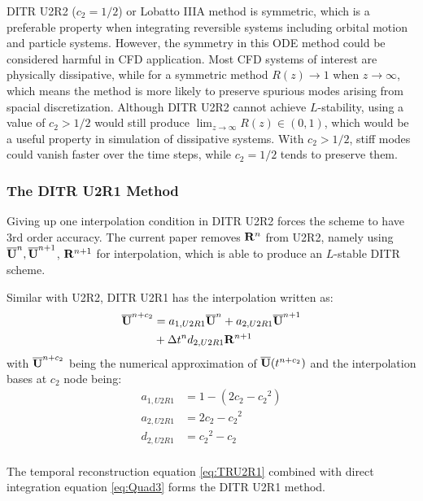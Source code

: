 \documentclass[preprint,12pt]{elsarticle}
\begin{document}
DITR U2R2 ($c_2=1/2$) or Lobatto IIIA method is symmetric,
which is a preferable property when integrating
reversible systems including orbital motion and particle 
systems. 
However,
the symmetry in this ODE method could be considered harmful in CFD application.
Most CFD systems of interest are physically dissipative,
while for a symmetric method
$R(z) \rightarrow 1$ when $z \rightarrow \infty$,
which means the method is more likely to preserve
spurious modes arising from spacial discretization.
Although DITR U2R2 cannot achieve $L$-stability, 
using a value of $c_2 > 1/2$ would still
produce $\lim_{z\rightarrow\infty}R(z)\in(0,1)$, which
would be a useful property in simulation of dissipative systems.
With  $c_2 > 1/2$, stiff modes could vanish faster over the time
steps, while $c_2 = 1/2$ tends to preserve them.

\subsubsection{The DITR U2R1 Method}

Giving up one interpolation condition in DITR U2R2
forces the scheme to have 3rd order accuracy.
The current paper removes $\mathbf{R}^{n}$ from U2R2, namely
using $\overline{\mathbf{U}}^{n},\overline{\mathbf{U}}^{n+1}$, $\mathbf{R}^{n+1}$ for interpolation,
which is able to produce an $L$-stable DITR scheme.

Similar with U2R2, DITR U2R1 has the interpolation
written as:
\begin{equation}
    \begin{aligned}
        \label{eq:TRU2R1}
        \overline{\mathbf{U}}^{n+c_2} & =
        a_{1,U2R1}\overline{\mathbf{U}}^{n} +
        a_{2,U2R1}\overline{\mathbf{U}}^{n + 1}
        \\ & +
        \mathrm\Delta t^n d_{2,U2R1}\mathbf{R}^{n + 1}
    \end{aligned}
\end{equation}
with $\overline{\mathbf{U}}^{n+c_2}$ being
the numerical approximation
of $\overline{\mathbf{U}}(t^{n+c_2})$
and the interpolation bases at $c_2$ node being:
\begin{equation}
    \begin{aligned}
        a_{1,U2R1} & = 1 - (2c_2 - {c_2}^2)\\
        a_{2,U2R1} & = 2c_2 - {c_2}^2 \\
        d_{2,U2R1} & = {c_2}^2 - {c_2}                 \\
    \end{aligned}
    \label{eq:interpU2R1}
\end{equation}

The temporal reconstruction equation \eqref{eq:TRU2R1}
combined with direct integration equation \eqref{eq:Quad3}
forms the DITR U2R1 method.
\end{document}
